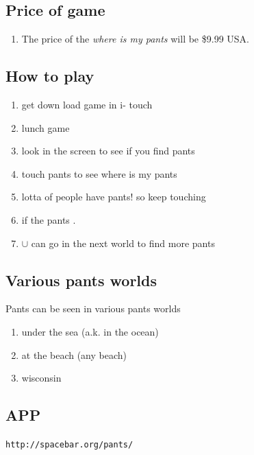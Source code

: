 \documentclass[twocolumn]{article}
\begin{document}
\subsection{Price of game}

\begin{enumerate}
\item The price of the {\it where is my pants} will be \$9.99 USA.
\end{enumerate}

\subsection{How to play}

\begin{enumerate}
\item get down load game in i- touch
\item lunch game
\item look in the screen to see if you find pants
\item touch pants to see where is my pants
\item lotta of people have pants! so keep touching
\item if the pants .
\item $\cup$ can go in the next world to find more pants
\end{enumerate}

\subsection{Various pants worlds}

Pants can be seen in various pants worlds
\begin{enumerate}
\item under the sea (a.k. in the ocean)
\item at the beach (any beach)
\item wisconsin
\end{enumerate}

\subsection{APP}

{\tt http://spacebar.org/pants/}
\end{document}
